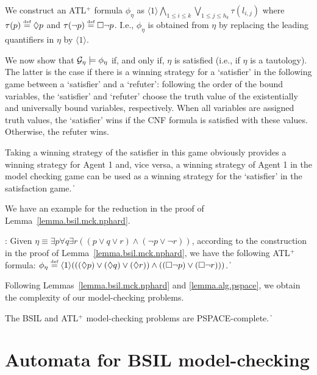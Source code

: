 \documentclass[11pt]{article}
\newcommand{\calg}{{\cal G}}
\newcommand{\defn}{\stackrel{\mbox{\tiny def}}{=}}
\newcommand{\pfrr}{\Box}
\newcommand{\pevt}{\Diamond}
\def\qed{\ifmmode\|\else{\unskip\nobreak\hfil
\penalty50\hskip1em\null\nobreak\hfil$\blacksquare$
\parfillskip=0pt\finalhyphendemerits=0\endgraf}\fi}
\begin{document}
We construct an ATL$^+$ formula $\phi_\eta$
as %
$\langle 1\rangle \bigwedge_{1\leq i\leq k}
\bigvee_{1\leq j\leq h_k} \tau(l_{i,j})$ 
where $\tau(p)\defn \pevt p$ and $\tau(\neg p)\defn \pfrr \neg p$. 
I.e., $\phi_\eta$ is obtained from $\eta$ by replacing the leading quantifiers in $\eta$ by $\langle 1 \rangle$.

We now show that $\calg_\eta \models \phi_\eta$ if, and only if, $\eta$ is satisfied (i.e., if $\eta$ is a tautology).
The  latter is the case if there is a winning strategy for a `satisfier' in the following game between a `satisfier' and a `refuter':
following the order of the bound variables, the `satisfier' and `refuter' choose the truth value of the existentially and universally bound variables, respectively.
When all variables are assigned truth values, the `satisfier' wins if the CNF formula is satisfied with these values. Otherwise, the refuter wins.

Taking a winning strategy of the satisfier in this game obviously provides a winning strategy for Agent 1 and, vice versa, a winning strategy of Agent 1 in the model checking game can be used as a winning strategy for the `satisfier' in the satisfaction game.
\qed

We have an example for the reduction in the proof 
of Lemma~\ref{lemma.bsil.mck.nphard}.  

{\example \label{exmp.bsil.nphard}:}
Given
$\eta\equiv \exists p\forall q\exists r
((p\vee q \vee r)\wedge(\neg p \vee \neg r))$,
according to the construction
in the proof of Lemma~\ref{lemma.bsil.mck.nphard},
we have the following ATL$^+$ formula:
$\phi_\eta\defn 
\langle1\rangle(((\pevt p)\vee (\pevt q) \vee (\pevt r))
  \wedge((\pfrr\neg p) \vee (\pfrr\neg r)))$.
\qed

Following Lemmas~\ref{lemma.bsil.mck.nphard} and
\ref{lemma.alg.pspace}, we obtain the complexity of our model-checking problems.

{\lemma\label{lemma.bsil.pspace.complete} The BSIL and ATL$^+$ model-checking
problems are PSPACE-complete.
} \qed



\section{Automata for BSIL model-checking
\label{sec.mck.gen}
}
\end{document}
